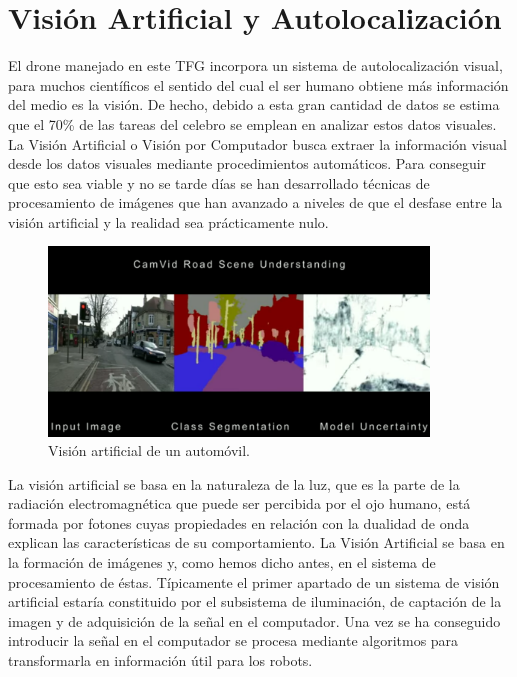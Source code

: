 \section{Visión Artificial y Autolocalización}
\hspace{1cm}  El drone manejado en este TFG incorpora un sistema de autolocalización visual, para muchos científicos el sentido del cual el ser humano obtiene más información del medio es la visión. De hecho, debido a esta gran cantidad de datos se estima que el 70\% de las tareas del celebro se emplean en analizar estos datos visuales. La Visión Artificial o Visión por Computador busca extraer la información visual desde los datos visuales mediante procedimientos automáticos. Para conseguir que esto sea viable y no se tarde días se han desarrollado técnicas de procesamiento de imágenes que han avanzado a niveles de que el desfase entre la visión artificial y la realidad sea prácticamente nulo.

\begin{figure}[H]
	\begin{center}
		\includegraphics[width=0.9\textwidth]{imag/IMG4.png}
				\caption{Visión artificial de un automóvil.}
	\label{fig:Vista artificial automoviles.}	
	\end{center}
\end{figure}

\hspace{1cm} La visión artificial se basa en la naturaleza de la luz, que es la parte de la radiación electromagnética que puede ser percibida por el ojo humano, está formada por fotones cuyas propiedades en relación con la dualidad de onda explican las características de su comportamiento. La Visión Artificial se basa en la formación de imágenes y, como hemos dicho antes, en el sistema de procesamiento de éstas. Típicamente el primer apartado de un sistema de visión artificial estaría constituido  por  el  subsistema  de  iluminación,  de  captación  de  la  imagen  y  de adquisición  de  la  señal  en  el  computador. Una vez se ha conseguido introducir la señal en el computador se procesa mediante algoritmos para transformarla en información útil para los robots.

